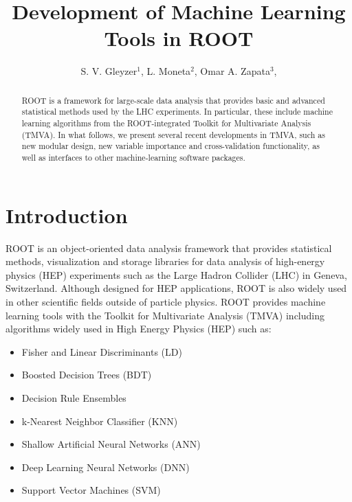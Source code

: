 \documentclass[a4paper]{jpconf}
\begin{document}
\title{Development of Machine Learning Tools in ROOT}
\author{S. V. Gleyzer$^1$, L. Moneta$^2$, Omar A. Zapata$^3$, }

\address{$^1$ University of Florida}
\address{$^2$ CERN}
\address{$^3$ University of Antioquia and Metropolitan Institute of Technology}


\begin{abstract}
ROOT is a framework for large-scale data analysis that provides basic and advanced statistical methods used by the LHC experiments. In particular, these include machine learning algorithms from the ROOT-integrated Toolkit for Multivariate Analysis (TMVA). In what follows, we present several recent developments in TMVA, such as new modular design, new variable importance and cross-validation functionality, as well as interfaces to other machine-learning software packages.
\end{abstract}



\section{Introduction}
ROOT is an object-oriented data analysis framework that provides statistical methods, visualization and storage libraries for data analysis of high-energy physics (HEP) experiments \cite{Antcheva20092499} such as the Large Hadron Collider (LHC) in Geneva, Switzerland. Although designed for HEP applications, ROOT is also widely used in other scientific fields outside of particle physics. ROOT provides machine learning tools with the Toolkit for Multivariate Analysis (TMVA) \cite{Hocker:2007ht} including algorithms widely used in High Energy Physics (HEP) such as:



\begin{itemize}  
\item Fisher and Linear Discriminants (LD)
\item Boosted Decision Trees (BDT)
\item Decision Rule Ensembles
\item k-Nearest Neighbor Classifier (KNN)
\item Shallow Artificial Neural Networks (ANN)
\item Deep Learning Neural Networks (DNN)
\item Support Vector Machines (SVM)
\end{itemize}
\end{document}
